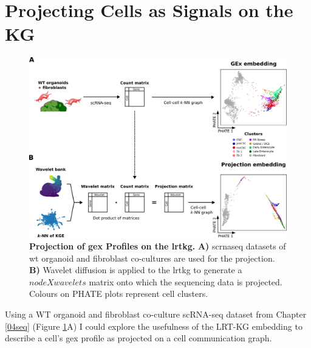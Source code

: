 
\section{Projecting Cells as Signals on the KG}

\begin{figure}
    \centering
    \includegraphics{06kg/figs/6KG_projection.png}
    \caption{\textbf{Projection of \acrshort{gex} Profiles on the \acrshort{lrtkg}.} \textbf{A)} \acrshort{scrnaseq} datasets of \acrshort{wt} organoid and fibroblast co-cultures are used for the projection. \textbf{B)} Wavelet diffusion is applied to the \acrshort{lrtkg} to generate a \(node X wavelets\) matrix onto which the sequencing data is projected. Colours on PHATE plots represent cell clusters.}
    \label{fig:6project}
\end{figure}

Using a WT organoid and fibroblast co-culture scRNA-seq dataset from Chapter \ref{04seq} (Figure \ref{fig:6project}A) I could explore the usefulness of the LRT-KG embedding to describe a cell's \acrfull{gex} profile as projected on a cell communication graph. 

